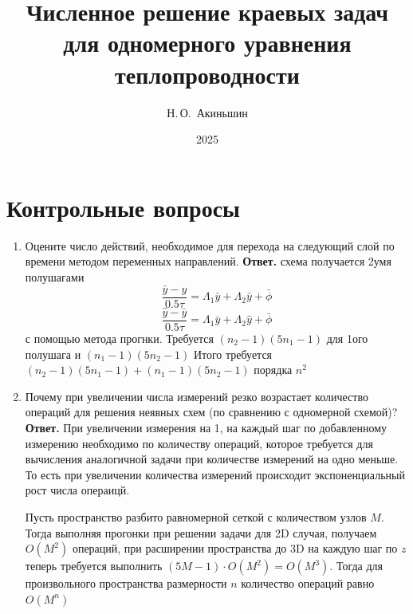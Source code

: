 \documentclass{article}
\title{Численное решение краевых задач для одномерного уравнения теплопроводности}
\author{Н.\,О.~Акиньшин}
\date{2025}
\begin{document}
    \maketitle
    \newpage
    \tableofcontents
    \newpage

    \section{Контрольные вопросы}
	\begin{enumerate}
		\item Оцените число действий, необходимое для перехода на
		следующий слой по времени методом переменных направлений.
		\newline 
		{\bfseries Ответ. } 
		схема получается 2умя полушагами
		\[
		\frac{\bar{y}-y }{0.5\tau} = \Lambda_1\bar{y} + \Lambda_2\bar{y} + \bar{\phi}
		\]
		\[
		\frac{\hat{y}-\bar{y}}{0.5 \tau} = \Lambda_1\bar{y} + \Lambda_2\hat{y} + \bar{\phi}
		\]
		с помощью метода прогнки. Требуется $(n_2-1)(5n_1-1)$  для 1ого полушага и $(n_1-1)(5n_2-1)$ 
		Итого требуется $(n_2-1)(5n_1-1) +  (n_1-1)(5n_2-1)$ порядка $n^2$
		\item Почему при увеличении числа измерений резко возрастает количество операций для решения неявных схем (по
		сравнению с одномерной схемой)?
		\newline
		{\bfseries Ответ. } 
		При увеличении измерения на 1, на каждый шаг по добавленному измерению необходимо по 
		количеству операций, которое требуется для 
		вычисления аналогичной задачи при количестве измерений на одно меньше. То есть
		при увеличении количества измерений происходит экспоненциальный рост числа операицй.

		Пусть пространство разбито равномерной сеткой с количеством узлов $M$.
		Тогда выполняя прогонки при решении задачи для 2D случая, получаем $O(M^2)$ операций, при расширении
		пространства до 3D на каждую шаг по $z$ теперь требуется выполнить $(5M - 1) \cdot O(M^2) = O(M^3)$.
		Тогда для произвольного пространства размерности $n$ 
		количество операций равно $O(M^n)$


\end{enumerate}
\end{document}
